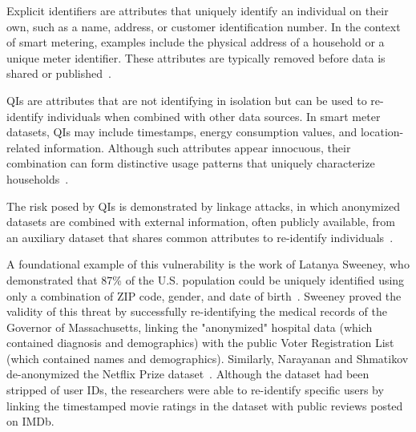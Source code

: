 Explicit identifiers are attributes that uniquely identify an individual on their own, such as a name, address, or customer identification number. In the context of smart metering, examples include the physical address of a household or a unique meter identifier. These attributes are typically removed before data is shared or published~\cite{Sweeney_kanon}.

\acfp{QI} are attributes that are not identifying in isolation but can be used to re-identify individuals when combined with other data sources. In smart meter datasets, \acp{QI} may include timestamps, energy consumption values, and location-related information. Although such attributes appear innocuous, their combination can form distinctive usage patterns that uniquely characterize households~\cite{Sweeney_kanon}.

The risk posed by \acp{QI} is demonstrated by linkage attacks, in which anonymized datasets are combined with external information, often publicly available, from an auxiliary dataset that shares common attributes to re-identify individuals~\cite{Sweeney_kanon}. 

A foundational example of this vulnerability is the work of Latanya Sweeney, who demonstrated that 87\% of the U.S. population could be uniquely identified using only a combination of ZIP code, gender, and date of birth~\cite{Sweeney_SimpleDemographics}. Sweeney proved the validity of this threat by successfully re-identifying the medical records of the Governor of Massachusetts, linking the "anonymized" hospital data (which contained diagnosis and demographics) with the public Voter Registration List (which contained names and demographics). Similarly, Narayanan and Shmatikov de-anonymized the Netflix Prize dataset~\cite{NetflixPaper}. Although the dataset had been stripped of user IDs, the researchers were able to re-identify specific users by linking the timestamped movie ratings in the dataset with public reviews posted on IMDb.



